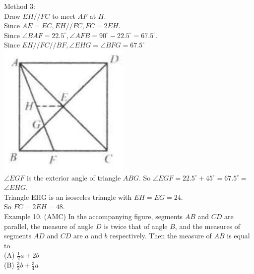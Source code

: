 \documentclass[10pt]{article}
\begin{document}
Method 3:\\
Draw \(E H / / F C\) to meet \(A F\) at \(H\).\\
Since \(A E=E C, E H / / F C, F C=2 E H\).\\
Since \(\angle B A F=22.5^{\circ}, \angle A F B=90^{\circ}-22.5^{\circ}=67.5^{\circ}\).\\
Since \(E H / / F C / / B F, \angle E H G=\angle B F G=67.5^{\circ}\)\\
\includegraphics[max width=\textwidth, center]{2025_04_17_97bc1f7e44d93c271a88g-110}\\
\(\angle E G F\) is the exterior angle of triangle \(A B G\). So \(\angle E G F=22.5^{\circ}+45^{\circ}=67.5^{\circ}=\) \(\angle E H G\).\\
Triangle EHG is an isosceles triangle with \(E H=E G=24\).\\
So \(F C=2 E H=48\).\\
Example 10. (AMC) In the accompanying figure, segments \(A B\) and \(C D\) are parallel, the measure of angle \(D\) is twice that of angle \(B\), and the measures of segments \(A D\) and \(C D\) are \(a\) and \(b\) respectively. Then the measure of \(A B\) is equal to\\
(A) \(\frac{1}{2} a+2 b\)\\
(B) \(\frac{3}{2} b+\frac{3}{4} a\)\\
\end{document}

